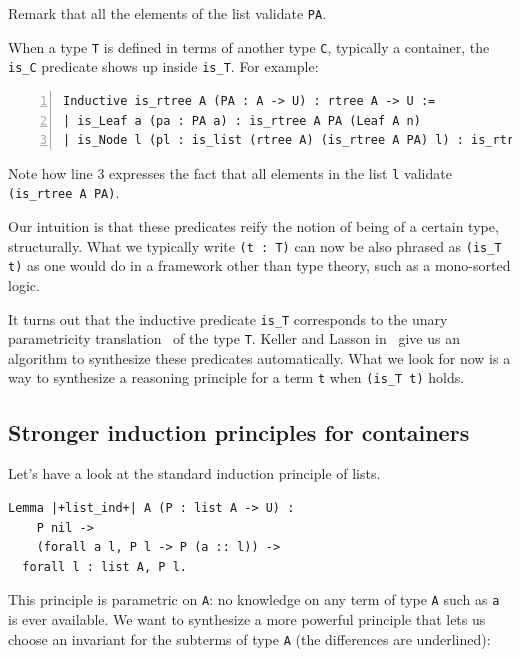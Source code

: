 \documentclass[a4paper,UKenglish,cleveref, autoref]{lipics-v2019}
\begin{document}
\noindent
Remark that all the elements of the list validate \lstinline+PA+.

When a type \lstinline+T+ is defined in terms of another type
\lstinline+C+, typically a container, the \lstinline+is_C+ predicate
shows up inside \lstinline+is_T+. For example:

\begin{lstlisting}[numbers=left]
Inductive is_rtree A (PA : A -> U) : rtree A -> U :=
| is_Leaf a (pa : PA a) : is_rtree A PA (Leaf A n)
| is_Node l (pl : is_list (rtree A) (is_rtree A PA) l) : is_rtree A PA (Node A l).
\end{lstlisting}

\noindent
Note how line 3 expresses the fact that all elements in the list
\lstinline+l+ validate \lstinline+(is_rtree A PA)+.

Our intuition is that these predicates reify the notion of being
of a certain type, structurally. What we typically write \lstinline+(t : T)+
can now be also phrased as \lstinline+(is_T t)+ as one would do in a
framework other than type theory, such as a mono-sorted logic.

It turns out that the inductive predicate \lstinline+is_T+ corresponds
to the unary parametricity translation~\cite{Wadler:1989:TF:99370.99404}
of the type \lstinline+T+.
Keller and Lasson in~\cite{keller:hal-00730913} give us an
algorithm to synthesize these predicates automatically.
What we look for now is a way to synthesize
a reasoning principle for a term \lstinline+t+ when 
\lstinline+(is_T t)+ holds.

\subsection{Stronger induction principles for containers} %

Let's have a look at the standard induction principle of lists.

\begin{lstlisting}
Lemma |+list_ind+| A (P : list A -> U) :
    P nil ->
    (forall a l, P l -> P (a :: l)) ->
  forall l : list A, P l.
\end{lstlisting}

\noindent
This principle is parametric on \lstinline+A+:
no knowledge on any term of type \lstinline+A+ such as \lstinline+a+ is
ever available.
We want to synthesize a more powerful principle that lets us choose
an invariant for the subterms of type \lstinline+A+
(the differences are underlined):
\end{document}
